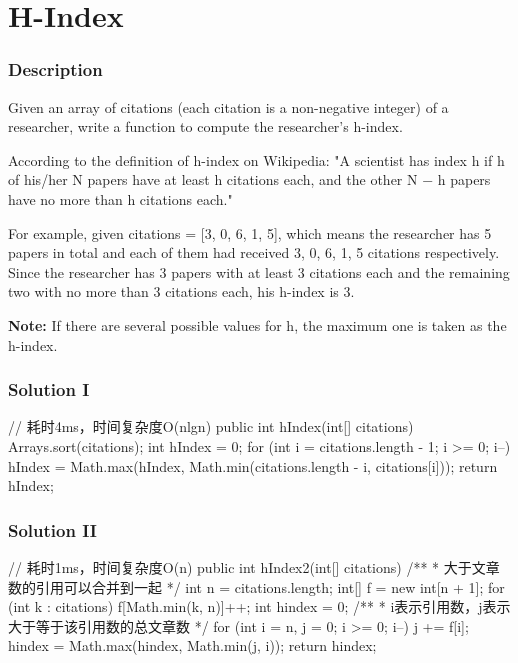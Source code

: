 \newpage

\section{H-Index} %

\subsubsection{Description}
Given an array of citations (each citation is a non-negative integer) of a researcher, write a function to compute the researcher's h-index.

According to the definition of h-index on Wikipedia: "A scientist has index h if h of his/her N papers have at least h citations each, and the other N − h papers have no more than h citations each."

For example, given citations = [3, 0, 6, 1, 5], which means the researcher has 5 papers in total and each of them had received 3, 0, 6, 1, 5 citations respectively. Since the researcher has 3 papers with at least 3 citations each and the remaining two with no more than 3 citations each, his h-index is 3.

\textbf{Note:} If there are several possible values for h, the maximum one is taken as the h-index.

\subsubsection{Solution I}

\begin{Code}
// 耗时4ms，时间复杂度O(nlgn)
public int hIndex(int[] citations) {
    Arrays.sort(citations);
    int hIndex = 0;
    for (int i = citations.length - 1; i >= 0; i--) {
        hIndex = Math.max(hIndex, Math.min(citations.length - i, citations[i]));
    }
    return hIndex;
}
\end{Code}

\subsubsection{Solution II}
\begin{Code}
// 耗时1ms，时间复杂度O(n)
public int hIndex2(int[] citations) {
    /**
     * 大于文章数的引用可以合并到一起
     */
    int n = citations.length;
    int[] f = new int[n + 1];
    for (int k : citations) {
        f[Math.min(k, n)]++;
    }
    int hindex = 0;
    /**
     * i表示引用数，j表示大于等于该引用数的总文章数
     */
    for (int i = n, j = 0; i >= 0; i--) {
        j += f[i];
        hindex = Math.max(hindex, Math.min(j, i));
    }
    return hindex;
}

\end{Code}

